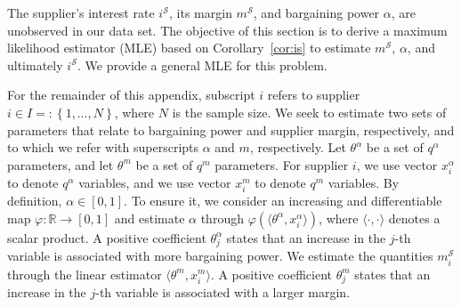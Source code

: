 \documentclass[A4,11pt]{article}
\newcommand{\sx}{\mathcal S}
\renewcommand{\~}[1]{\tilde{#1}}
\renewcommand{\-}[1]{\overline{#1}}
\begin{document}
\begin{appendices}
The supplier's interest rate $i^\sx$, its margin $m^{\sx}$, and bargaining power $\alpha$, are unobserved in our data set. The objective of this section is to derive a maximum likelihood estimator (MLE) based on Corollary~\ref{cor:is} to estimate $m^{\sx}$, $\alpha$, and ultimately $i^\sx$. We provide a general MLE for this problem.

For the remainder of this appendix, subscript $i$ refers to supplier $i\in I =: \left\{1,\dots,N\right\}$, where $N$ is the sample size. We seek to estimate two sets of parameters that relate to bargaining power and supplier margin, respectively, and to which we refer with superscripts $\alpha$ and $m$, respectively. Let $\theta^\alpha$ be a set of $q^\alpha$ parameters, and let $\theta^m$ be a set of $q^m$ parameters. For supplier $i$, we use vector $x_i^\alpha$ to denote $q^\alpha$ variables, and we use vector $x_i^m$ to denote $q^m$ variables. By definition, $\alpha\in[0,1]$. To ensure it, we consider an increasing and differentiable map $\varphi : \mathbb R\rightarrow\left[0,1\right]$ and estimate $\alpha$ through $\varphi\left(\langle \theta^\alpha,x^\alpha_i\rangle\right)$, where $\langle \cdot,\cdot\rangle$ denotes a scalar product. A positive coefficient $\theta^\alpha_j$ states that an increase in the $j$-th variable is associated with more bargaining power. We estimate the quantities $m^{\sx}_i$ through the linear estimator $\langle \theta^m,x^m_i\rangle$. A positive coefficient $\theta^m_j$ states that an increase in the $j$-th variable is associated with a larger margin.


\end{appendices}
\end{document}
